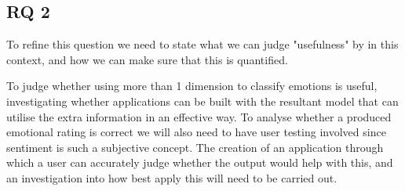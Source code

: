 \subsection{RQ 2}

To refine this question we need to state what we can judge "usefulness" by in this context, and how we can make sure that this is quantified.

To judge whether using more than 1 dimension to classify emotions is useful, investigating whether applications can be built with the resultant model that can utilise the extra information in an effective way. To analyse whether a produced emotional rating is correct we will also need to have user testing involved since sentiment is such a subjective concept. The creation of an application through which a user can accurately judge whether the output would help with this, and an investigation into how best apply this will need to be carried out. 

